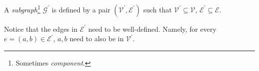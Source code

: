 \begin{definition}[Subgraph]\label{def:subgraph}
	A \emph{subgraph}\footnote{Sometimes \emph{component}.} \(\mathcal{G}^\prime\) is defined by a pair \((\mathcal{V}^\prime, \mathcal{E}^\prime)\) such that \(\mathcal{V}^\prime \subseteq \mathcal{V}\),
	\(\mathcal{E}^\prime\subseteq\mathcal{E}\).
\end{definition}

\begin{note}
	Notice that the edges in \(\mathcal{E}^\prime\) need to be well-defined. Namely, for every
	\(e = (a,b) \in\mathcal{E}^\prime\), \(a, b\) need to also be in \(\mathcal{V}^\prime\).
\end{note}